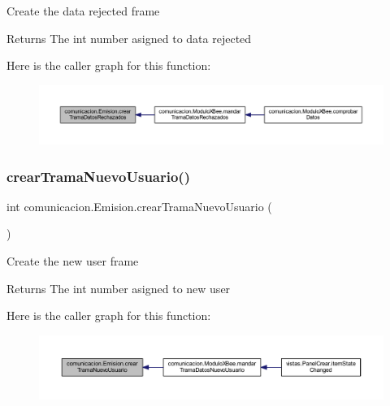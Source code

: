 Create the data rejected frame \begin{DoxyReturn}{Returns}
The int number asigned to data rejected 
\end{DoxyReturn}
Here is the caller graph for this function\+:
\nopagebreak
\begin{figure}[H]
\begin{center}
\leavevmode
\includegraphics[width=350pt]{classcomunicacion_1_1_emision_aafa487246461f3d94bb9939a0f345b50_icgraph}
\end{center}
\end{figure}
\mbox{\label{classcomunicacion_1_1_emision_a3aa146bfc37a8c4e409097c4cf02fad0}} 
\subsubsection{\texorpdfstring{crear\+Trama\+Nuevo\+Usuario()}{crearTramaNuevoUsuario()}}
{\footnotesize\ttfamily int comunicacion.\+Emision.\+crear\+Trama\+Nuevo\+Usuario (\begin{DoxyParamCaption}{ }\end{DoxyParamCaption})}

Create the new user frame \begin{DoxyReturn}{Returns}
The int number asigned to new user 
\end{DoxyReturn}
Here is the caller graph for this function\+:
\nopagebreak
\begin{figure}[H]
\begin{center}
\leavevmode
\includegraphics[width=350pt]{classcomunicacion_1_1_emision_a3aa146bfc37a8c4e409097c4cf02fad0_icgraph}
\end{center}
\end{figure}
\mbox{\label{classcomunicacion_1_1_emision_aa2b41a69ac8589e519c45e5f674ab135}} 
